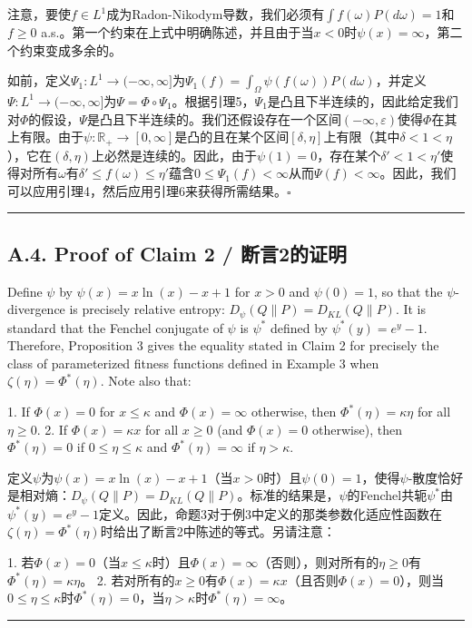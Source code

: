 \documentclass[12pt,a4paper]{article}
\newenvironment{original}
  {\par\noindent\color{black}\smallskip}
  {\par\smallskip}
\newenvironment{translation}
  {\par\noindent\color{blue!70!black}\smallskip}
  {\par\medskip\hrule\medskip}
\begin{document}
\begin{translation}
注意，要使$f \in L^1$成为Radon-Nikodym导数，我们必须有$\int f(\omega) P(d\omega) = 1$和$f \geq 0$ a.s.。第一个约束在上式中明确陈述，并且由于当$x < 0$时$\psi(x) = \infty$，第二个约束变成多余的。

如前，定义$\Psi_1: L^1 \to (-\infty, \infty]$为$\Psi_1(f) = \int_\Omega \psi(f(\omega)) P(d\omega)$，并定义$\Psi: L^1 \to (-\infty, \infty]$为$\Psi = \Phi \circ \Psi_1$。根据引理5，$\Psi_1$是凸且下半连续的，因此给定我们对$\Phi$的假设，$\Psi$是凸且下半连续的。我们还假设存在一个区间$(-\infty, \varepsilon)$使得$\Phi$在其上有限。由于$\psi: \mathbb{R}_+ \to [0, \infty]$是凸的且在某个区间$[\delta, \eta]$上有限（其中$\delta < 1 < \eta$），它在$(\delta, \eta)$上必然是连续的。因此，由于$\psi(1) = 0$，存在某个$\delta' < 1 < \eta'$使得对所有$\omega$有$\delta' \leq f(\omega) \leq \eta'$蕴含$0 \leq \Psi_1(f) < \infty$从而$\Psi(f) < \infty$。因此，我们可以应用引理4，然后应用引理6来获得所需结果。$\square$
\end{translation}
\subsection*{A.4. Proof of Claim 2 / 断言2的证明}

\begin{original}
Define $\psi$ by $\psi(x) = x\ln(x) - x + 1$ for $x > 0$ and $\psi(0) = 1$, so that the $\psi$-divergence is precisely relative entropy: $D_\psi(Q\|P) = D_{KL}(Q\|P)$. It is standard that the Fenchel conjugate of $\psi$ is $\psi^*$ defined by $\psi^*(y) = e^y - 1$. Therefore, Proposition 3 gives the equality stated in Claim 2 for precisely the class of parameterized fitness functions defined in Example 3 when $\zeta(\eta) = \Phi^*(\eta)$. Note also that:

1. If $\Phi(x) = 0$ for $x \leq \kappa$ and $\Phi(x) = \infty$ otherwise, then $\Phi^*(\eta) = \kappa\eta$ for all $\eta \geq 0$.
2. If $\Phi(x) = \kappa x$ for all $x \geq 0$ (and $\Phi(x) = 0$ otherwise), then $\Phi^*(\eta) = 0$ if $0 \leq \eta \leq \kappa$ and $\Phi^*(\eta) = \infty$ if $\eta > \kappa$.
\end{original}
\begin{translation}
定义$\psi$为$\psi(x) = x\ln(x) - x + 1$（当$x > 0$时）且$\psi(0) = 1$，使得$\psi$-散度恰好是相对熵：$D_\psi(Q\|P) = D_{KL}(Q\|P)$。标准的结果是，$\psi$的Fenchel共轭$\psi^*$由$\psi^*(y) = e^y - 1$定义。因此，命题3对于例3中定义的那类参数化适应性函数在$\zeta(\eta) = \Phi^*(\eta)$时给出了断言2中陈述的等式。另请注意：

1. 若$\Phi(x) = 0$（当$x \leq \kappa$时）且$\Phi(x) = \infty$（否则），则对所有的$\eta \geq 0$有$\Phi^*(\eta) = \kappa\eta$。
2. 若对所有的$x \geq 0$有$\Phi(x) = \kappa x$（且否则$\Phi(x) = 0$），则当$0 \leq \eta \leq \kappa$时$\Phi^*(\eta) = 0$，当$\eta > \kappa$时$\Phi^*(\eta) = \infty$。
\end{translation}
\end{document}
